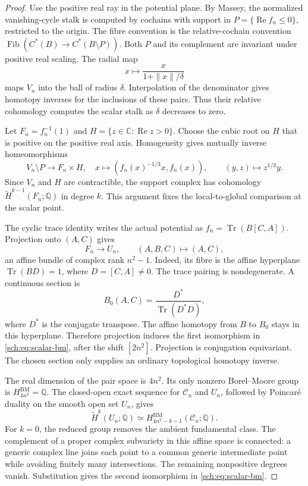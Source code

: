 \begin{proof}
Use the positive real ray in the potential plane. By
Massey\cite[\S1, p.~2]{schMasseyST}, the normalized
vanishing-cycle stalk is computed by cochains with support in
$P=\{\operatorname{Re}f_n\leq0\}$, restricted to the origin.
The fibre convention is the relative-cochain convention
$\operatorname{Fib}(C^*(B)\to C^*(B\setminus P))$.
Both $P$ and its complement are invariant under positive real scaling.
The radial map
\[
 x\longmapsto \frac{x}{1+\|x\|/\delta}
\]
maps $V_n$ into the ball of radius $\delta$. Interpolation of the
denominator gives homotopy inverses for the inclusions of these pairs.
Thus their relative cohomology computes the scalar stalk as
$\delta$ decreases to zero.

Let $F_n=f_n^{-1}(1)$ and $H=\{z\in\mathbb C:\operatorname{Re}z>0\}$.
Choose the cubic root on $H$ that is positive on the positive real axis.
Homogeneity gives mutually inverse homeomorphisms
\[
 V_n\setminus P\longrightarrow F_n\times H,
 \quad x\longmapsto(f_n(x)^{-1/3}x,f_n(x)),
 \qquad (y,z)\longmapsto z^{1/3}y.
\]
Since $V_n$ and $H$ are contractible, the support complex has
cohomology $\widetilde H^{k-1}(F_n;\mathbb Q)$ in degree $k$.
This argument fixes the local-to-global comparison at the scalar point.

The cyclic trace identity writes the actual potential as
$f_n=\operatorname{Tr}(B[C,A])$. Projection onto $(A,C)$ gives
\begin{equation}
 F_n\longrightarrow U_n,
 \qquad (A,B,C)\longmapsto(A,C),
 \label{sch:eq:affine-fibre}
\end{equation}
an affine bundle of complex rank $n^2-1$. Indeed, its fibre is the
affine hyperplane $\operatorname{Tr}(BD)=1$, where $D=[C,A]\ne0$.
The trace pairing is nondegenerate. A continuous section is
\[
 B_0(A,C)=\frac{D^*}{\operatorname{Tr}(D^*D)},
\]
where $D^*$ is the conjugate transpose. The affine homotopy from $B$
to $B_0$ stays in this hyperplane. Therefore projection induces the
first isomorphism in \eqref{sch:eq:scalar-bm}, after the shift $[2n^2]$.
Projection is conjugation equivariant. The chosen section only supplies
an ordinary topological homotopy inverse.

The real dimension of the pair space is $4n^2$. Its only nonzero
Borel--Moore group is $H^{\mathrm{BM}}_{4n^2}=\mathbb Q$.
The closed-open exact sequence for $\mathcal C_n$ and $U_n$, followed
by Poincar\'e duality on the smooth open set $U_n$, gives
\[
 \widetilde H^k(U_n;\mathbb Q)
       \simeq H^{\mathrm{BM}}_{4n^2-k-1}(\mathcal C_n;\mathbb Q).
\]
For $k=0$, the reduced group removes the ambient fundamental class.
The complement of a proper complex subvariety in this affine space
is connected: a generic complex line joins each point to a common
generic intermediate point while avoiding finitely many intersections.
The remaining nonpositive degrees vanish. Substitution gives the
second isomorphism in \eqref{sch:eq:scalar-bm}.


\end{proof}
